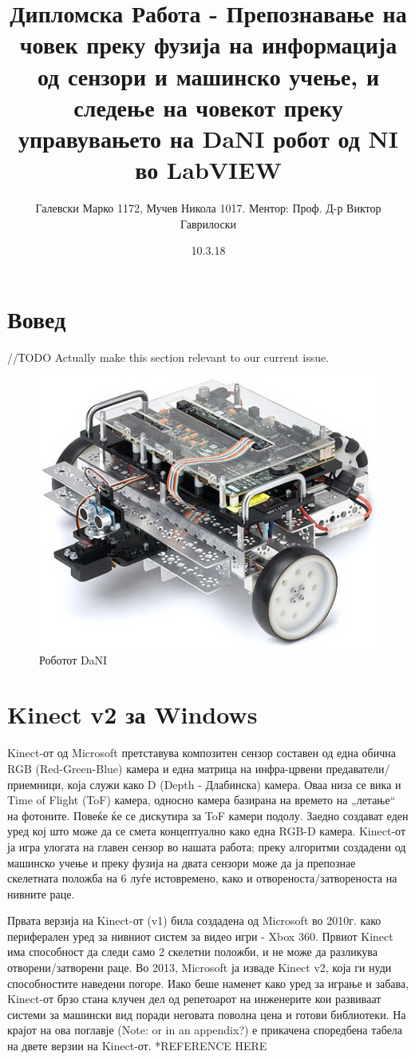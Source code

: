\documentclass{article}
\title{Дипломска Работа - Препознавање на човек преку фузија на информација од сензори и машинско учење, и следење на човекот
				преку управувањето на  DaNI робот од NI во LabVIEW}
\date{10.3.18}
\author{Галевски Марко 1172, Мучев Никола 1017.		Ментор: Проф. Д-р Виктор Гаврилоски}
\begin{document}
    \maketitle{}
    \newpage
    \tableofcontents
    \newpage
    
\section{Вовед}
//ТODO Actually make this section relevant to our current issue.
\begin{figure}[H]
\includegraphics[width=0.75\linewidth]{dani_isometric.jpg}
\centering
\caption{Роботот DaNI}
\label{fig:dani_isometric.jpg}
\end{figure} 

\newpage
\section{Kinect v2 за Windows}
Kinect-от од Microsoft претставува композитен сензор составен од една обична RGB (Red-Green-Blue) камера и една матрица на инфра-црвени предаватели/приемници, која служи како D (Depth - Длабинска) камера. Оваа низа се вика и Time of Flight (ToF) камера, односно камера базирана на времето на „летање“ на фотоните. Повеќе ќе се дискутира за ToF камери подолу. Заедно создават еден уред кој што може да се смета концептуално како една RGB-D камера. Kinect-от ја игра улогата на главен сензор во нашата работа; преку алгоритми создадени од машинско учење и преку фузија на двата сензори може да ја препознае скелетната положба на 6 луѓе истовремено, како и отвореноста/затвореноста на нивните раце.

Првата верзија на Kinect-от (v1) била создадена од Microsoft во 2010г. како периферален уред за нивниот систем за видео игри - Xbox 360. Првиот Kinect има способност да следи само 2 скелетни положби, и не може да разликува отворени/затворени раце. Во 2013, Microsoft ја изваде Kinect v2, која ги нуди способностите наведени погоре. Иако беше наменет како уред за играње и забава, Kinect-от брзо стана клучен дел од репетоарот на инженерите кои развиваат системи за машински вид поради неговата поволна цена и готови библиотеки. На крајот на ова поглавје (Note: or in an appendix?) е прикачена споредбена табела на двете верзии на Kinect-от.
*REFERENCE HERE
\end{document}
